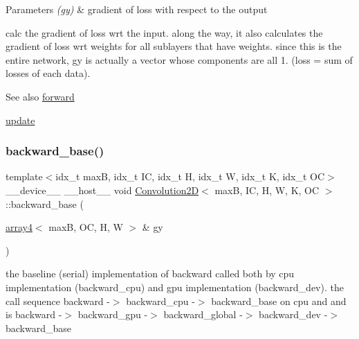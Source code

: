 \begin{DoxyParams}{Parameters}
{\em (gy)} & gradient of loss with respect to the output\\
\hline
\end{DoxyParams}
calc the gradient of loss wrt the input. along the way, it also calculates the gradient of loss wrt weights for all sublayers that have weights. since this is the entire network, gy is actually a vector whose components are all 1. (loss = sum of losses of each data). \begin{DoxySeeAlso}{See also}
\hyperlink{structConvolution2D_ae6dcfaea38b779de24bbda730c57083e}{forward} 

\hyperlink{structConvolution2D_ac9fd666f96904bb7f62dc39cebae7a25}{update} 
\end{DoxySeeAlso}
\mbox{\label{structConvolution2D_af202e85ae6c5aa5e4aae6869a8891fc3}} 
\subsubsection{\texorpdfstring{backward\+\_\+base()}{backward\_base()}}
{\footnotesize\ttfamily template$<$idx\+\_\+t maxB, idx\+\_\+t IC, idx\+\_\+t H, idx\+\_\+t W, idx\+\_\+t K, idx\+\_\+t OC$>$ \\
\+\_\+\+\_\+device\+\_\+\+\_\+ \+\_\+\+\_\+host\+\_\+\+\_\+ void \hyperlink{structConvolution2D}{Convolution2D}$<$ maxB, IC, H, W, K, OC $>$\+::backward\+\_\+base (\begin{DoxyParamCaption}\item[{\hyperlink{structarray4}{array4}$<$ maxB, OC, H, W $>$ \&}]{gy }\end{DoxyParamCaption})\hspace{0.3cm}{\ttfamily [inline]}}



the baseline (serial) implementation of backward called both by cpu implementation (backward\+\_\+cpu) and gpu implementation (backward\+\_\+dev). the call sequence backward -\/$>$ backward\+\_\+cpu -\/$>$ backward\+\_\+base on cpu and and is backward -\/$>$ backward\+\_\+gpu -\/$>$ backward\+\_\+global -\/$>$ backward\+\_\+dev -\/$>$ backward\+\_\+base 



